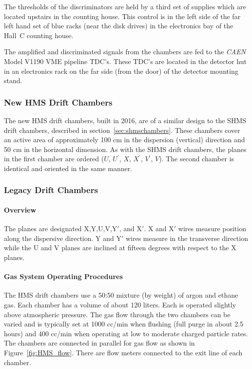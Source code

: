 {The thresholds of the discriminators are held by a third set of supplies
which are located upstairs in the counting house. This control
is in the left side of the far left hand set of blue racks (near the disk drives) in the
electronics bay of the Hall~C counting house.

The amplified and discriminated signals from the chambers are fed
to the {\em CAEN} Model V1190 VME pipeline TDC's. These
TDC's are located in the detector hut in an electronics rack on the
far side (from the door) of the detector mounting stand.


\subsubsection{New HMS Drift Chambers}
The new HMS drift chambers, built in 2016, are of a similar design to the SHMS
drift chambers, described in section~\ref{sec:shmschambers}.  These chambers
cover an active area of approximately 100 cm in the dispersion (vertical)
direction and 50 cm in the horizontal dimension.   As with the SHMS
drift chambers, the planes in the first chamber are ordered
($U$, $U^{\prime}$, $X$, $X^{\prime}$, $V^{\prime}$, $V$).  The second
chamber is identical and oriented in the same manner.

\subsubsection{Legacy Drift Chambers}
\label{sec:legacydriftchambers}
\paragraph{Overview}


The planes are designated X,Y,U,V,Y$'$, and X$'$.
X and X$'$ wires measure position along the dispersive direction.
Y and Y$'$ wires measure in the transverse direction while
the U and V planes are inclined at fifteen degrees with respect to the
X planes.

\paragraph {Gas System Operating Procedures}

The HMS drift chambers use a 50:50 mixture (by weight) of argon and
ethane gas.  Each chamber has a volume of about 120 liters.  Each is
operated slightly above atmospheric pressure.  The gas flow through
the two chambers can be varied and is typically set at 1000 cc/min
when flushing (full purge in about 2.5 hours) and 400 cc/min when operating
at low to moderate charged particle rates.  The chambers are connected
in parallel for gas flow as shown in Figure~\ref{fig:HMS_flow}.  There are flow
meters connected to the exit line of each chamber.

}
